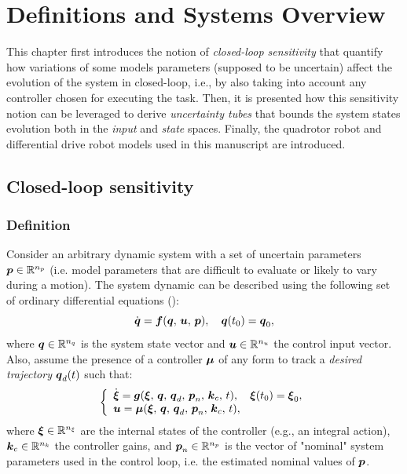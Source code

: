 \chapter{Definitions and Systems Overview}\label{chap:models}

This chapter first introduces the notion of \emph{closed-loop sensitivity} that quantify how variations of some models parameters (supposed to be uncertain) affect the evolution of the system in closed-loop, i.e., by also taking into account any controller chosen for executing the task.
Then, it is presented how this sensitivity notion can be leveraged to derive \emph{uncertainty tubes} that bounds the system states evolution both in the \emph{input} and \emph{state} spaces.
Finally, the quadrotor robot and differential drive robot models used in this manuscript are introduced.

\section{Closed-loop sensitivity}
\subsection{Definition}\label{sec:sensi}

Consider an arbitrary dynamic system with a set of uncertain parameters $\boldsymbol{p} \in \mathbb{R}^{n_p}$ (i.e. model parameters that are difficult to evaluate or likely to vary during a motion).
The system dynamic can be described using the following set of ordinary differential equations ():
\begin{equation}\label{eq:dyna}
    \dot{\boldsymbol{q}}=\boldsymbol{f}(\boldsymbol{q},\,\boldsymbol{u},\,\boldsymbol{p}), \quad \boldsymbol{q}(t_0)=\boldsymbol{q}_{0},
\end{equation}
where $\boldsymbol{q}\in \mathbb{R}^{n_{q}}$ is the system state vector and $\boldsymbol{u}\in \mathbb{R}^{n_{u}}$ the control input vector.
Also, assume the presence of a controller $\boldsymbol{\mu}$ of any form to track a \emph{desired trajectory} $\boldsymbol{q}_d(t)$ such that:
\begin{equation}\label{eq:ctrl}
     \left \{
     \begin{array}{l l}
          \dot{\boldsymbol{\xi}} = \boldsymbol{g}(\boldsymbol{\xi},\,\boldsymbol{q},\,\boldsymbol{q}_d,\,\boldsymbol{p}_n,\,\boldsymbol{k}_c,\,t), \quad \boldsymbol{\xi}(t_0)=\boldsymbol{\xi}_{0}, \\
          \boldsymbol{u}=\boldsymbol{\mu}(\boldsymbol{\xi},\,\boldsymbol{q},\,\boldsymbol{q}_d,\,\boldsymbol{p}_n,\,\boldsymbol{k}_c,\,t), 
   \end{array} 
   \right .
\end{equation}
where $\boldsymbol{\xi}\in \mathbb{R}^{n_{\xi}}$ are the internal states of the controller (e.g., an integral action), $\boldsymbol{k}_{c}\in \mathbb{R}^{n_{k}}$ the controller gains, and $\boldsymbol{p}_{n}\in{\mathbb{R}^{n_{p}}}$ is the vector of "nominal" system parameters used in the control loop, i.e. the estimated nominal values of $\boldsymbol{p}$.

